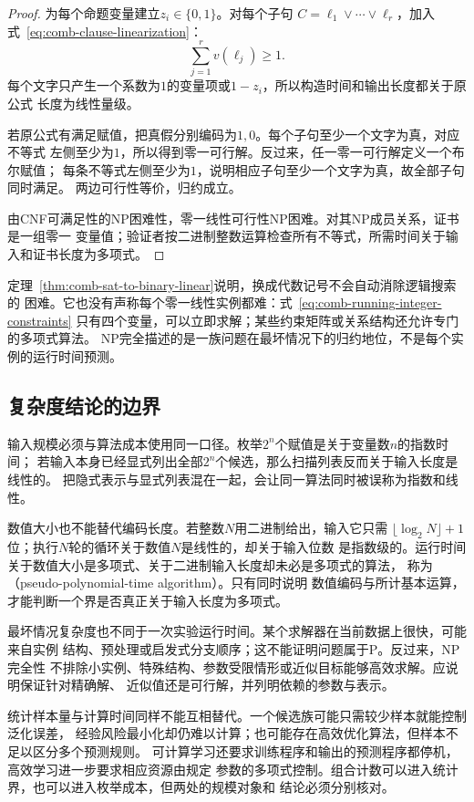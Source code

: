 \begin{proof}
为每个命题变量建立$z_i\in\{0,1\}$。对每个子句
$C=\ell_1\lor\cdots\lor\ell_r$，加入式~\eqref{eq:comb-clause-linearization}：
\[
  \sum_{j=1}^{r}v(\ell_j)\geq1.
\]
每个文字只产生一个系数为$1$的变量项或$1-z_i$，所以构造时间和输出长度都关于原公式
长度为线性量级。

若原公式有满足赋值，把真假分别编码为$1,0$。每个子句至少一个文字为真，对应不等式
左侧至少为$1$，所以得到零一可行解。反过来，任一零一可行解定义一个布尔赋值；
每条不等式左侧至少为$1$，说明相应子句至少一个文字为真，故全部子句同时满足。
两边可行性等价，归约成立。

由CNF可满足性的NP困难性，零一线性可行性NP困难。对其NP成员关系，证书是一组零一
变量值；验证者按二进制整数运算检查所有不等式，所需时间关于输入和证书长度为多项式。
\end{proof}

定理~\ref{thm:comb-sat-to-binary-linear}说明，换成代数记号不会自动消除逻辑搜索的
困难。它也没有声称每个零一线性实例都难：式~\eqref{eq:comb-running-integer-constraints}
只有四个变量，可以立即求解；某些约束矩阵或关系结构还允许专门的多项式算法。
NP完全描述的是一族问题在最坏情况下的归约地位，不是每个实例的运行时间预测。

\subsection{复杂度结论的边界}

输入规模必须与算法成本使用同一口径。枚举$2^n$个赋值是关于变量数$n$的指数时间；
若输入本身已经显式列出全部$2^n$个候选，那么扫描列表反而关于输入长度是线性的。
把隐式表示与显式列表混在一起，会让同一算法同时被误称为指数和线性。

数值大小也不能替代编码长度。若整数$N$用二进制给出，输入它只需
$\lfloor\log_2N\rfloor+1$位；执行$N$轮的循环关于数值$N$是线性的，却关于输入位数
是指数级的。运行时间关于数值大小是多项式、关于二进制输入长度却未必是多项式的算法，
称为（pseudo-polynomial-time algorithm）。只有同时说明
数值编码与所计基本运算，才能判断一个界是否真正关于输入长度为多项式。

最坏情况复杂度也不同于一次实验运行时间。某个求解器在当前数据上很快，可能来自实例
结构、预处理或启发式分支顺序；这不能证明问题属于$\mathrm{P}$。反过来，NP完全性
不排除小实例、特殊结构、参数受限情形或近似目标能够高效求解。应说明保证针对精确解、
近似值还是可行解，并列明依赖的参数与表示。

统计样本量与计算时间同样不能互相替代。一个候选族可能只需较少样本就能控制泛化误差，
经验风险最小化却仍难以计算；也可能存在高效优化算法，但样本不足以区分多个预测规则。
可计算学习还要求训练程序和输出的预测程序都停机，高效学习进一步要求相应资源由规定
参数的多项式控制。组合计数可以进入统计界，也可以进入枚举成本，但两处的规模对象和
结论必须分别核对。

